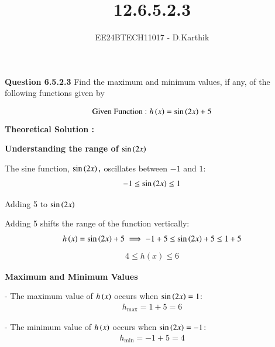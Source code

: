 \documentclass[journal]{IEEEtran}
\begin{document}

\vspace{3cm}

\title{12.6.5.2.3}
\author{EE24BTECH11017 - D.Karthik}
{\let\newpage\relax\maketitle}

\renewcommand{\thefigure}{\theenumi}
\renewcommand{\thetable}{\theenumi}
\setlength{\intextsep}{10pt} %


\renewcommand{\thetable}{\theenumi}

\textbf{Question 6.5.2.3}
Find the maximum and minimum values, if any, of the following functions
given by

\begin{align}
\text{Given Function :  }
    h\left(x\right) = \sin{\ensuremath{\left(2x\right)}}+5 
\end{align}
\textbf{Theoretical Solution :}



\textbf{Understanding the range of $ \sin\left(2x\right)$ }

The sine function, $ \sin\left(2x\right),$ oscillates between $-1$ and $1$:
\begin{align}
    -1 \leq \sin\left(2x\right) \leq 1
\end{align}

Adding 5 to $ \sin\left(2x\right) $

Adding 5 shifts the range of the function vertically:
\begin{align}
    h\left(x\right) = \sin\left(2x\right) + 5 \implies -1 + 5 \leq \sin\left(2x\right) + 5 \leq 1 + 5
\end{align}
\begin{align}
    4 \leq h(x) \leq 6
\end{align}

\textbf{ Maximum and Minimum Values}

- The maximum value of $ h\left(x\right)$  occurs when $ \sin\left(2x\right) = 1 $:
\begin{align}
    h_{\text{max}} = 1 + 5 = 6
\end{align}

- The minimum value of $ h\left(x\right) $ occurs when $ \sin\left(2x\right) = -1 $:
\begin{align}
    h_{\text{min}} = -1 + 5 = 4
\end{align}
\end{document}
